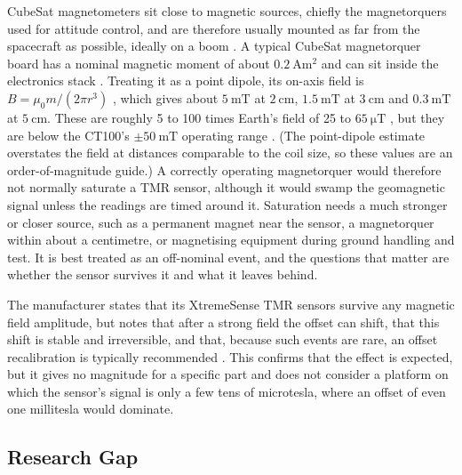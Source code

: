 \documentclass[12pt,a4paper]{article}
\begin{document}
CubeSat magnetometers sit close to magnetic sources, chiefly the magnetorquers used for attitude control, and are therefore usually mounted as far from the spacecraft as possible, ideally on a boom \cite{nss_magnetometer}. A typical CubeSat magnetorquer board has a nominal magnetic moment of about $\SI{0.2}{\ampere\metre\squared}$ and can sit inside the electronics stack \cite{isis_imtq}. Treating it as a point dipole, its on-axis field is $B = \mu_0 m / (2\pi r^3)$ \cite{jackson}, which gives about $\SI{5}{\milli\tesla}$ at $\SI{2}{\centi\metre}$, $\SI{1.5}{\milli\tesla}$ at $\SI{3}{\centi\metre}$ and $\SI{0.3}{\milli\tesla}$ at $\SI{5}{\centi\metre}$. These are roughly 5 to 100 times Earth's field of 25 to $\SI{65}{\micro\tesla}$ \cite{wmm}, but they are below the CT100's $\pm\SI{50}{\milli\tesla}$ operating range \cite{ct100_datasheet}. (The point-dipole estimate overstates the field at distances comparable to the coil size, so these values are an order-of-magnitude guide.) A correctly operating magnetorquer would therefore not normally saturate a TMR sensor, although it would swamp the geomagnetic signal unless the readings are timed around it. Saturation needs a much stronger or closer source, such as a permanent magnet near the sensor, a magnetorquer within about a centimetre, or magnetising equipment during ground handling and test. It is best treated as an off-nominal event, and the questions that matter are whether the sensor survives it and what it leaves behind.

The manufacturer states that its XtremeSense TMR sensors survive any magnetic field amplitude, but notes that after a strong field the offset can shift, that this shift is stable and irreversible, and that, because such events are rare, an offset recalibration is typically recommended \cite{allegro_an133}. This confirms that the effect is expected, but it gives no magnitude for a specific part and does not consider a platform on which the sensor's signal is only a few tens of microtesla, where an offset of even one millitesla would dominate.

\subsection{Research Gap}
\label{sec:gap}
\end{document}
